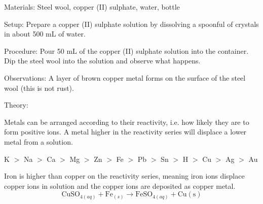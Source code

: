 \begin{multicols}{2}

\begin{description*}
\item[Materials:]{Steel wool, copper (II) sulphate, water, bottle}
\item[Setup:]{Prepare a copper (II) sulphate solution by dissolving a spoonful of crystals in about 500 mL of water.}
\item[Procedure:]{Pour 50 mL of the copper (II) sulphate solution into the container. Dip the steel wool into the solution and observe what happens.}
\item[Observations:]{A layer of brown copper metal forms on the surface of the steel wool (this is not rust).}
\item[Theory:]{

Metals can be arranged according to their reactivity, i.e. how likely they are to form positive ions. A metal higher in the reactivity series will displace a lower metal from a solution. 
\begin{center}
K $>$ Na $>$ Ca $>$ Mg $>$ Zn $>$ Fe $>$ Pb $>$ Sn $>$ H $>$ Cu $>$ Ag $>$ Au
\end{center}
Iron is higher than copper on the reactivity series, meaning iron ions displace copper ions in solution and the copper ions are deposited as copper metal. $$ \mathrm{CuSO}_{4(aq)} + \mathrm{Fe}_{(s)} \longrightarrow \mathrm{FeSO}_{4(aq)} + \mathrm{Cu(s)} $$}
\end{description*}


\end{multicols}
